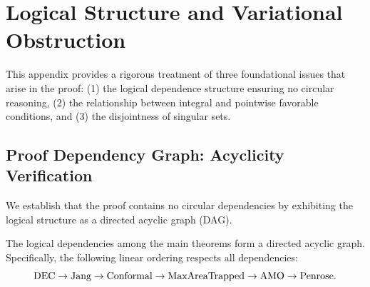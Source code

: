 \section{Logical Structure and Variational Obstruction}
\label{app:LogicalStructure}

This appendix provides a rigorous treatment of three foundational issues that arise in the proof: (1) the logical dependence structure ensuring no circular reasoning, (2) the relationship between integral and pointwise favorable conditions, and (3) the disjointness of singular sets.

\subsection{Proof Dependency Graph: Acyclicity Verification}
\label{subsec:DependencyGraph}

We establish that the proof contains no circular dependencies by exhibiting the logical structure as a directed acyclic graph (DAG).

\begin{theorem}\label{thm:AcyclicDependencies}
The logical dependencies among the main theorems form a directed acyclic graph. Specifically, the following linear ordering respects all dependencies:
\[
\textup{DEC} \to \textup{Jang} \to \textup{Conformal} \to \textup{MaxAreaTrapped} \to \textup{AMO} \to \textup{Penrose}.
\]
\end{theorem}

